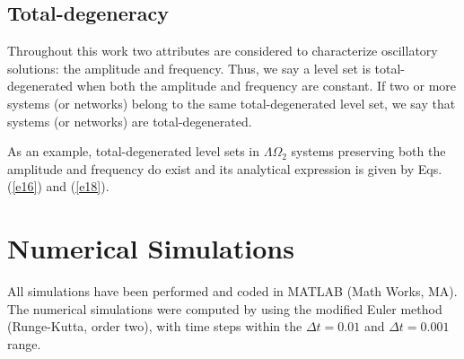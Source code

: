 \subsection{Total-degeneracy}
Throughout this work two attributes are considered to characterize oscillatory solutions: the amplitude and frequency. Thus, we say a level set is total-degenerated when both the amplitude and frequency are constant. If two or more systems (or networks) belong to the same total-degenerated level set, we say that systems (or networks) are total-degenerated.

As an example, total-degenerated level sets in $\Lambda \Omega_{2}$ systems preserving both the amplitude and frequency do exist and its analytical expression is given by Eqs. (\ref{e16}) and (\ref{e18}).

\section{Numerical Simulations}
All simulations have been performed and coded in MATLAB (Math Works, MA). The numerical simulations were computed by using the modified Euler method (Runge-Kutta, order two), with time steps within the $\Delta t =0.01$ and $\Delta t = 0.001$ range.
